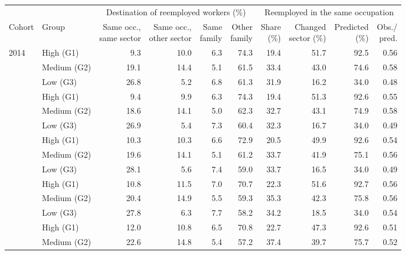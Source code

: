 {\footnotesize
\begin{threeparttable}
\begin{tabular}{llrrrrrrrr}
\toprule
 & & \multicolumn{4}{c}{Destination of reemployed workers (\%)} & \multicolumn{4}{c}{Reemployed in the same occupation} \\
\cmidrule(lr){3-6}\cmidrule(lr){7-10}
Cohort & Group & \shortstack{Same occ.,\\same sector} & \shortstack{Same occ.,\\other sector} & \shortstack{Same\\family} & \shortstack{Other\\family} & \shortstack{Share\\(\%)} & \shortstack{Changed\\sector (\%)} & \shortstack{Predicted\\(\%)} & \shortstack{Obs./\\pred.} \\
\midrule
2014 & High (G1) & 9.3 & 10.0 & 6.3 & 74.3 & 19.4 & 51.7 & 92.5 & 0.56 \\
 & Medium (G2) & 19.1 & 14.4 & 5.1 & 61.5 & 33.4 & 43.0 & 74.6 & 0.58 \\
 & Low (G3) & 26.8 & 5.2 & 6.8 & 61.3 & 31.9 & 16.2 & 34.0 & 0.48 \\
\addlinespace[3pt]
2015 & High (G1) & 9.4 & 9.9 & 6.3 & 74.3 & 19.4 & 51.3 & 92.6 & 0.55 \\
 & Medium (G2) & 18.6 & 14.1 & 5.0 & 62.3 & 32.7 & 43.1 & 74.9 & 0.58 \\
 & Low (G3) & 26.9 & 5.4 & 7.3 & 60.4 & 32.3 & 16.7 & 34.0 & 0.49 \\
\addlinespace[3pt]
2016 & High (G1) & 10.3 & 10.3 & 6.6 & 72.9 & 20.5 & 49.9 & 92.6 & 0.54 \\
 & Medium (G2) & 19.6 & 14.1 & 5.1 & 61.2 & 33.7 & 41.9 & 75.1 & 0.56 \\
 & Low (G3) & 28.1 & 5.6 & 7.4 & 59.0 & 33.7 & 16.5 & 34.0 & 0.49 \\
\addlinespace[3pt]
2019 & High (G1) & 10.8 & 11.5 & 7.0 & 70.7 & 22.3 & 51.6 & 92.7 & 0.56 \\
 & Medium (G2) & 20.4 & 14.9 & 5.5 & 59.3 & 35.3 & 42.3 & 75.8 & 0.56 \\
 & Low (G3) & 27.8 & 6.3 & 7.7 & 58.2 & 34.2 & 18.5 & 34.0 & 0.54 \\
\addlinespace[3pt]
2020 & High (G1) & 12.0 & 10.8 & 6.5 & 70.8 & 22.7 & 47.3 & 92.6 & 0.51 \\
 & Medium (G2) & 22.6 & 14.8 & 5.4 & 57.2 & 37.4 & 39.7 & 75.7 & 0.52 \\

\end{tabular}
\end{threeparttable}}
